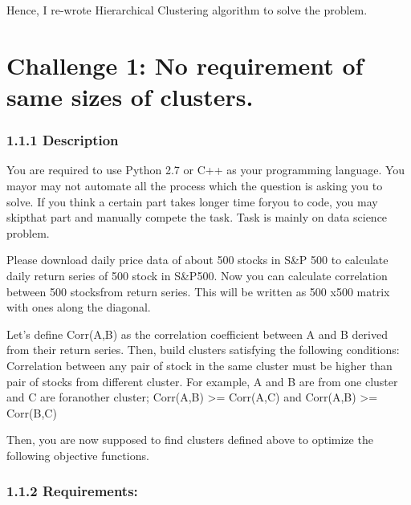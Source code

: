 \documentclass[11pt]{article}
\begin{document}
Hence, I re-wrote Hierarchical Clustering algorithm to solve the
problem.

    \section{Challenge 1: No requirement of same sizes of
clusters.}\label{challenge-1-no-requirement-of-same-sizes-of-clusters.}

\subsubsection{1.1.1 Description}\label{description}

You are required to use Python 2.7 or C++ as your programming language.
You mayor may not automate all the process which the question is asking
you to solve. If you think a certain part takes longer time foryou to
code, you may skipthat part and manually compete the task. Task is
mainly on data science problem.

Please download daily price data of about 500 stocks in S\&P 500 to
calculate daily return series of 500 stock in S\&P500. Now you can
calculate correlation between 500 stocksfrom return series. This will be
written as 500 x500 matrix with ones along the diagonal.

Let's define Corr(A,B) as the correlation coefficient between A and B
derived from their return series. Then, build clusters satisfying the
following conditions: Correlation between any pair of stock in the same
cluster must be higher than pair of stocks from different cluster. For
example, A and B are from one cluster and C are foranother cluster;
Corr(A,B) \textgreater{}= Corr(A,C) and Corr(A,B) \textgreater{}=
Corr(B,C)

Then, you are now supposed to find clusters defined above to optimize
the following objective functions.

    \subsubsection{1.1.2 Requirements:}\label{requirements}
\end{document}
